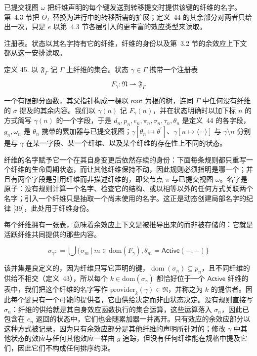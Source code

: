 已提交视图 \(\omega\) 把纤维声明的每个键发送到转移提交时提供该键的纤维的名字。第~4.3 节把 \(\Theta _ { \Gamma }\) 替换为进行中的转移所需的扩展；定义~44 的其余部分对两者只给出一次，只是 \(e\) 以第~4.3 节各层引入的更丰富的效应类型来读取。

注册表。状态以其名字持有它的纤维，纤维的身份以及第~3.2 节的余效应上下文都从这一安排读取。

定义 45. 以 \(\mathfrak { F } _ { \Gamma }\) 记 $\Gamma$ 上纤维的集合。状态 \(\gamma \in \Gamma\) 携带一个注册表

\[
F _ { \gamma } : \mathfrak { N } \rightharpoonup \mathfrak { F } _ { \Gamma }\tag{39}
\]

一个有限部分函数，其父指针构成一棵以 $\mathsf { r o o t }$ 为根的树，连同 $\Gamma$ 中任何没有纤维的 \(\sigma\) 提及的其余内容。我们以 \(\gamma ( n )\) 记 \(F _ { \gamma } ( n )\)，并在状态明确时以加下标 $n$ 的方式简写 \(\gamma ( n )\) 的一个字段，于是 \(d _ { n } , p _ { n } , e _ { n } , \pi _ { n } , \sigma _ { n } , \tau _ { n } , \theta _ { n }\) 是定义~44 的各字段，\(g _ { n } , \omega _ { n }\) 是 \(\theta _ { n }\) 携带的累加器与已提交视图；\(\gamma [ \theta _ { n } \mapsto \theta ^ { \prime } ]\)、$\gamma [ n \mapsto \langle \cdots \rangle ]$ 与 \(\gamma \setminus n\) 分别是与 \(\gamma\) 在某一字段、某一个纤维、以及某个纤维的存在性上不同的状态。

纤维的名字赋予它一个在其自身变更后依然存续的身份：下面每条规则都只重写一个纤维的生命周期状态，而让其他纤维保持不动，因此规则必须指明是哪一个；并且有两个字段是引用纤维而非描述纤维的，即父节点 $\pi$ 与已提交视图 $\omega$。名字是原子：没有规则计算一个名字、检查它的结构、或以相等以外的任何方式关联两个名字；引入一个纤维只是抽取一个尚未使用的名字。这正是动态创建局部名字的纪律 {[}39{]}，此处用于纤维身份。

每个纤维拥有一张表，意味着余效应上下文是被推导出来的而非被存储的：它就是活跃纤维共同提供的那些内容。

\[
\sigma _ { \gamma } : = \bigcup \{ \sigma _ { m } ~ | ~ m \in \mathrm { d o m } ( F _ { \gamma } ) , \theta _ { m } = \mathsf { A c t i v e } ( - , - ) \}\tag{40}
\]

该并集是良定义的，因为纤维只写它声明的键，\(\operatorname { d o m } ( \sigma _ { n } ) \subseteq p _ { n }\)，且不同纤维的供给不相交（定义~43），所以每个 \(k \in \mathrm { d o m } ( \sigma _ { \gamma } )\) 都恰好位于一个 $\mathsf { A c t i v e }$ 纤维的表中，我们把这个纤维的名字写作 \(\mathrm { p r o v i d e r } _ { k } ( \gamma ) \in \mathfrak { N }\)，并称之为 $k$ 的提供者。因此每个键只有一个可能的提供者，它由供给决定而非由状态决定。没有规则直接写 \(\sigma _ { n }\)：纤维的供给就是其自身效应函数执行的集合运算，这些运算落入 \(\sigma _ { n }\)，因此已包含在 \(e _ { n }\) 返回的状态中，它们也会随累加器一并离开。只有效应的余效应部分以这种方式被记录，因为只有余效应部分是其他纤维的声明所针对的；修改 $\gamma$ 中其他状态的效应与任何其他效应一样由 $g$ 追踪，但没有任何纤维能在规格中提及它们，因此它们不构成任何排序约束。

